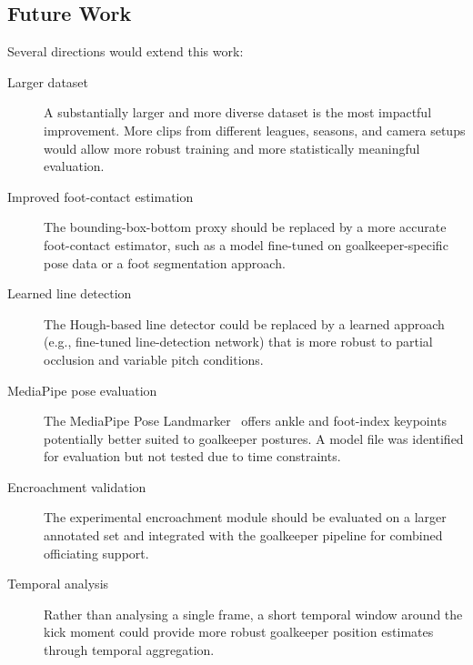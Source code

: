 \documentclass[12pt,a4paper,twoside]{article}
\begin{document}
\subsection{Future Work}

Several directions would extend this work:

\begin{description}
  \item[Larger dataset] A substantially larger and more diverse dataset is the
        most impactful improvement. More clips from different leagues, seasons,
        and camera setups would allow more robust training and more statistically
        meaningful evaluation.

  \item[Improved foot-contact estimation] The bounding-box-bottom proxy should
        be replaced by a more accurate foot-contact estimator, such as a model
        fine-tuned on goalkeeper-specific pose data or a foot segmentation approach.

  \item[Learned line detection] The Hough-based line detector could be replaced
        by a learned approach (e.g., fine-tuned line-detection network) that is
        more robust to partial occlusion and variable pitch conditions.

  \item[MediaPipe pose evaluation] The MediaPipe Pose Landmarker~\cite{lugaresi2019mediapipe}
        offers ankle and foot-index keypoints potentially better suited to
        goalkeeper postures. A model file was identified for evaluation but
        not tested due to time constraints.

  \item[Encroachment validation] The experimental encroachment module should be
        evaluated on a larger annotated set and integrated with the goalkeeper
        pipeline for combined officiating support.

  \item[Temporal analysis] Rather than analysing a single frame, a short
        temporal window around the kick moment could provide more robust
        goalkeeper position estimates through temporal aggregation.
\end{description}
\end{document}
